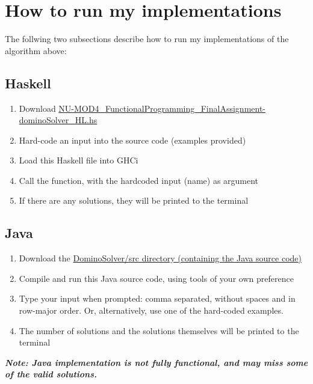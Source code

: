 \documentclass[a4paper, 11pt]{article}
\begin{document}
\section{How to run my implementations}
The follwing two subsections describe how to run my implementations of the algorithm above:
\subsection{Haskell}
\begin{enumerate}\setlength\itemsep{-1mm}
    \item Download \href{https://github.com/huulie/NU-MOD4_FunctionalProgramming-FinalAssignment/blob/master/haskell/NU-MOD4_FunctionalProgramming_FinalAssignment-dominoSolver_HL.hs}{NU-MOD4\_FunctionalProgramming\_FinalAssignment-dominoSolver\_HL.hs}
    \item Hard-code an input into the source code (examples provided)
    \item Load this Haskell file into GHCi
    \item Call the  function, with the hardcoded input (name) as argument
    \item If there are any solutions, they will be printed to the terminal
\end{enumerate}
\subsection{Java}
\begin{enumerate}\setlength\itemsep{-1mm}
    \item Download the \href{https://github.com/huulie/NU-MOD4_FunctionalProgramming-FinalAssignment/tree/master/java/NU-MOD4_FunctionalProgramming_FinalAssignment-dominoSolver_HL/DominoSolver/src}{DominoSolver\//src\/ directory (containing the Java source code)}
    \item Compile and run this Java source code, using tools of your own preference
    \item Type your input when prompted: comma separated, without spaces and in row-major order. Or, alternatively,  use one of the hard-coded examples.
    \item The number of solutions and the solutions themselves will be printed to the terminal
\end{enumerate}
\textit{\textbf{Note: Java implementation is not fully functional, and may miss some of the valid solutions.}}
\end{document}
